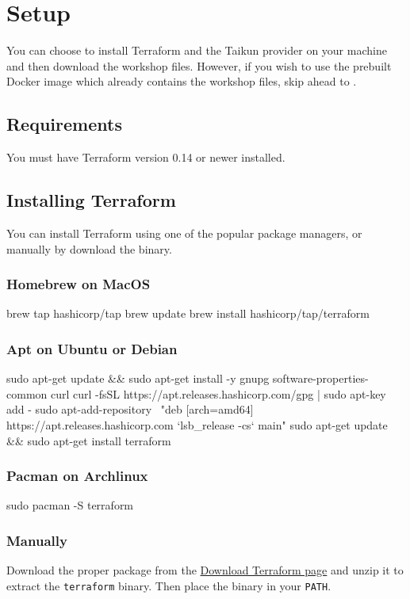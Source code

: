 \section{Setup}

You can choose to install Terraform and the Taikun provider on your machine and
then download the workshop files.
However, if you wish to use the prebuilt Docker image which already contains
the workshop files, skip ahead to .

\subsection{Requirements}
You must have Terraform version 0.14 or newer installed.

\subsection{Installing Terraform}
You can install Terraform using one of the popular package managers, or manually by
download the binary.
\subsubsection{Homebrew on MacOS}
\begin{shell}
brew tap hashicorp/tap
brew update
brew install hashicorp/tap/terraform
\end{shell}

\subsubsection{Apt on Ubuntu or Debian}
\begin{shell}
sudo apt-get update && sudo apt-get install -y gnupg software-properties-common curl
curl -fsSL https://apt.releases.hashicorp.com/gpg | sudo apt-key add -
sudo apt-add-repository \
"deb [arch=amd64] https://apt.releases.hashicorp.com `lsb_release -cs` main"
sudo apt-get update && sudo apt-get install terraform
\end{shell}

\subsubsection{Pacman on Archlinux}
\begin{shell}
sudo pacman -S terraform
\end{shell}

\subsubsection{Manually}
Download the proper package from the \href{https://www.terraform.io/downloads.html}{Download Terraform page}
and unzip it to extract the \texttt{terraform} binary.
Then place the binary in your \texttt{PATH}.\\

